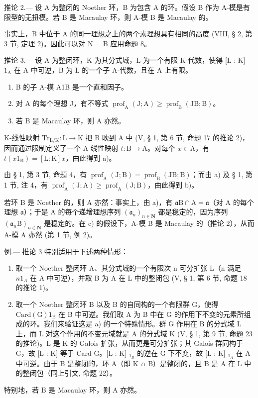 推论 2.--- 设 A 为整闭的 Noether 环，B 为包含 A 的环。假设 B 作为 A-模是有限型的无扭模。若 B 是 Macaulay 环，则 A-模 B 是 Macaulay 的。

事实上，B 中位于 A 的同一理想之上的两个素理想具有相同的高度 (VIII, § 2, 第 3 节, 定理 2)。因此可以对 N = B 应用命题 8。

推论 3.--- 设 A 为整闭环，K 为其分式域，L 为一个有限 K-代数，使得 {[}L : K{]} \(1_{\mathrm{A}}\) 在 A 中可逆，B 为 L 的一个子 A-代数，且在 A 上有限。

\begin{enumerate}
\def\labelenumi{\alph{enumi})}
\item
  B 的子 A-模 A1B 是一个直和因子。
\item
  对 A 的每个理想 J，有不等式 \(\operatorname{prof}_{\mathrm{A}}(\mathrm{J};\mathrm{A})\geqslant\operatorname{prof}_{\mathrm{B}}(\mathrm{JB};\mathrm{B})\)。
\item
  若 B 是 Macaulay 环，则 A 亦然。
\end{enumerate}

K-线性映射 \(\mathrm{Tr}_{\mathrm{L/K}}: \mathrm{L} \to \mathrm{K}\) 把 B 映到 A 中 (V, § 1, 第 6 节, 命题 17 的推论 2)，因而通过限制定义了一个 A-线性映射 \(t: \mathrm{B} \to \mathrm{A}\)。对每个 \(x \in \mathrm{A}\)，有 \(t(x1_{\mathrm{B}}) = [\mathrm{L}: \mathrm{K}]x\)，由此得到 a)。

由 § 1, 第 3 节, 命题 4，有 \(\operatorname{prof}_{\mathrm{A}}(\mathrm{J};\mathrm{B}) = \operatorname{prof}_{\mathrm{B}}(\mathrm{JB};\mathrm{B})\)；而由 a) 及 § 1, 第 1 节, 注 4，有 \(\operatorname{prof}_{\mathrm{A}}(\mathrm{J};\mathrm{A}) \geqslant \operatorname{prof}_{\mathrm{A}}(\mathrm{J};\mathrm{B})\)，由此得到 b)。

若环 B 是 Noether 的，则 A 亦然：事实上，由 a)，有 \(\mathfrak{a}\mathrm{B} \cap \mathrm{A} = \mathfrak{a}\)（对 A 的每个理想 \(\mathfrak{a}\)）；于是 A 的每个递增理想序列 \((\mathfrak{a}_n)_{n \in \mathbf{N}}\) 都是稳定的，因为序列 \((\mathfrak{a}_n\mathrm{B})_{n \in \mathbf{N}}\) 是稳定的。在 c) 的假设下，A-模 B 是 Macaulay 的（推论 2），从而 A-模 A 亦然 (第 1 节, 例 2)。

例.--- 推论 3 特别适用于下述两种情形：

\begin{enumerate}
\def\labelenumi{\alph{enumi})}
\item
  取一个 Noether 整闭环 A、其分式域的一个有限次 n 可分扩张 L（n 满足 \(n1_{A}\) 在 A 中可逆），并取 B 为 A 在 L 中的整闭包 (V, § 1, 第 6 节, 命题 18 的推论 1)。
\item
  取一个 Noether 整闭环 B 以及 B 的自同构的一个有限群 G，使得 \(\mathrm{Card(G)1_B}\) 在 B 中可逆。我们取 A 为 B 中在 G 的作用下不变的元素所组成的环。我们来验证这是 a) 的一个特殊情形。群 G 作用在 B 的分式域 L 上，而 L 对这个作用的不变元域就是 A 的分式域 K (V, § 1, 第 9 节, 命题 23 的推论)。L 是 K 的 Galois 扩张，从而更是可分扩张；其 Galois 群同构于 G，故 {[}L : K{]} 等于 Card G。{[}L : K{]} \(_{1_{B}}\) 的逆在 G 下不变，故 {[}L : K{]} \(_{1_{A}}\) 在 A 中可逆。由于 B 是整闭的，环 A（即 K ∩ B）是整闭的，且 B 是 A 在 L 中的整闭包（同上引文, 命题 22）。
\end{enumerate}

特别地，若 B 是 Macaulay 环，则 A 亦然。

